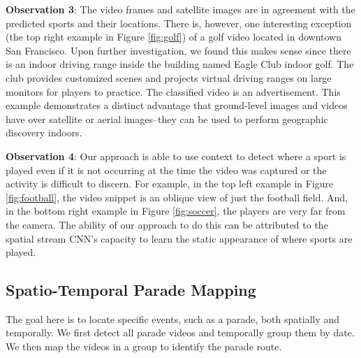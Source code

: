\documentclass[sigconf]{acmart}
\begin{document}
	
	\noindent \textbf{Observation 3}: The video frames and satellite images are in agreement with the predicted sports and their locations. There is, however, one interesting exception (the top right example in Figure \ref{fig:golf}) of a golf video located in downtown San Francisco. Upon further investigation, we found this makes sense since there is an indoor driving range inside the building named Eagle Club indoor golf. The club provides customized scenes and projects virtual driving ranges on large monitors for players to practice. The classified video is an advertisement. This example demonstrates a distinct advantage that ground-level images and videos have over satellite or aerial images--they can be used to perform geographic discovery indoors.
	
	\noindent \textbf{Observation 4}: Our approach is able to use context to detect where a sport is played even if it is not occurring at the time the video was captured or the activity is difficult to discern. For example, in the top left example in Figure \ref{fig:football}, the video snippet is an oblique view of just the football field. And, in the bottom right example in Figure \ref{fig:soccer}, the players are very far from the camera. The ability of our approach to do this can be attributed to the spatial stream CNN's capacity to learn the static appearance of where sports are played.
	
	\subsection{Spatio-Temporal Parade Mapping}
	\label{sec:spatio_temporal_parade_mapping}
	The goal here is to locate specific events, such as a parade, both spatially and temporally. We first detect all parade videos and temporally group them by date. We then map the videos in a group to identify the parade route.
	
\end{document}
